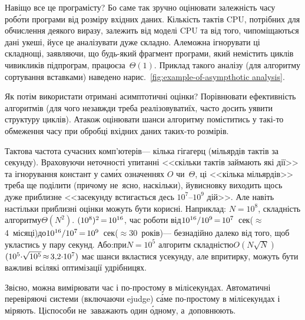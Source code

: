 Навіщо все це програмісту? Бо саме так зручно оцінювати залежність часу роб\'{о}ти програми від розміру вхідних даних. Кількість тактів CPU, потрібних для обчислення деякого виразу, залежить від моделі CPU та від того, чи\nolinebreak[3] поміщаються дані у\nolinebreak[3] кеші, й\nolinebreak[3] усе це аналізувати дуже складно. Але\nolinebreak[3] можна ігнорувати ці складнощі, заявляючи, що будь-який фрагмент програми, який не\nolinebreak[3] містить циклів чи\nolinebreak[3] викликів підпрограм, працює\nolinebreak[1] за~$\Theta(1)$.
Приклад такого аналізу (для алгоритму сортування вставками) наведено на\nolinebreak[3] рис.~\ref{fig:example-of-asympthotic analysis}.

Як потім використати отримані асимптотичні оцінки? Порівнювати ефективність алгоритмів (для чого не\nolinebreak[3] завжди треба реалізовувати\nolinebreak[3] їх, часто досить уявити структуру циклів). А\nolinebreak[3] також оцінювати шанси алгоритму поміститись у такі-то обмеження часу при обробці вхідних даних таких-то розмірів.

Тактова частота сучасних комп'ютерів\nolinebreak[3] --- кілька гігагерц (мільярдів тактів за секунду). Враховуючи неточності у\nolinebreak[3] питанні <<скільки тактів займають які дії>> та ігнорування констант у сам\'{и}х означеннях $O$ чи~$\Theta$, ці <<кілька мільярдів>> треба ще поділити (причому не~ясно, на\nolinebreak[3] скільки), й\nolinebreak[1] у\nolinebreak[3] висновку виходить щось дуже приблизне <<за\nolinebreak[3] секунду встигається десь $10^7$--$10^9$ дій>>. Але навіть настільки приблизні оцінки можуть бути корисні. 
\label{text:first-example-how-to-see-algo-will-not-fit-in-time-limit}
Наприклад: $N{=}10^8$, складність алгоритму\nolinebreak[3] $\Theta(N^2)$. $(10^8)^2\dib{{=}}10^{16}$, час роботи від\nolinebreak[2] $10^{16}/10^9\dib{{=}}10^7$~сек\nolinebreak[2] ($\approx$4~місяці)\linebreak[1] до\nolinebreak[1] $10^{16}/10^7\dib{{=}}10^9$~сек\nolinebreak[2] ($\approx$30~років)\nolinebreak[3] --- безнадійно далеко від того, щоб укластись у пару секунд. Або:\nolinebreak[3] при\nolinebreak[2] $N{=}10^5$ алгоритм складністю\nolinebreak[3] $O(N\sqrt{N})$ $({10^5{\cdot}\sqrt{10^5}}\dib{{\approx}}{3{,}2{\cdot}10^7})$ має шанси вкластися у\nolinebreak[3] секунду, але впритирку, можуть бути важливі всілякі оптимізації у\nolinebreak[3] дрібницях.

Звісно, можна вимірювати час і по-простому в мілісекундах. Автоматичні перевіряючі системи (включаючи ejudge) с\'{а}ме по-простому в мілісекундах і міряють. Ці\nolinebreak[3] способи не~заважають один \'{о}дному, а~доповнюють.



